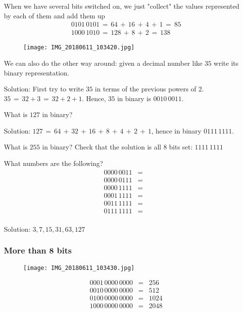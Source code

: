 \documentclass{article}
\begin{document}
When we have several bits switched on, we just "collect" the values represented by each
of them and add them up
\begin{eqnarray*}
0101\,0101\,=\,64\,+\,16\,+\,4\,+\,1\,=\,85 \\
1000\,1010\,=\,128\,+\,8\,+\,2\,=\,138
\end{eqnarray*}

\begin{figure}[H]
\texttt{[image: IMG\_20180611\_103420.jpg]}
\end{figure}

We can also do the other way around: given a decimal number like $35$ write its binary representation.

Solution: First try to write $35$ in terms of the previous powers of 2. $35\,=\,32+3\,=\,32+2+1$.
Hence, $35$ in binary is $0010\,0011$.

What is $127$ in binary? 

Solution: $127\,=\,64\,+\,32\,+\,16\,+\,8\,+\,4\,+\,2\,+\,1$, hence in binary $0111\,1111$.

What is $255$ in binary? Check that the solution is all 8 bits set: $1111\,1111$

What numbers are the following?
\begin{eqnarray*}
0000\,0011 &=& \\
0000\,0111 &=& \\
0000\,1111 &=& \\
0001\,1111 &=& \\
0011\,1111 &=& \\
0111\,1111 &=& \\
\end{eqnarray*}

Solution: $3,7,15,31,63,127$

\subsubsection{More than 8 bits}
\begin{figure}[H]
\texttt{[image: IMG\_20180611\_103430.jpg]}
\end{figure}
\begin{eqnarray*}
0001\,0000\,0000 &=& 256 \\
0010\,0000\,0000 &=& 512 \\
0100\,0000\,0000 &=& 1024 \\
1000\,0000\,0000 &=& 2048 \\
\end{eqnarray*}
\end{document}
